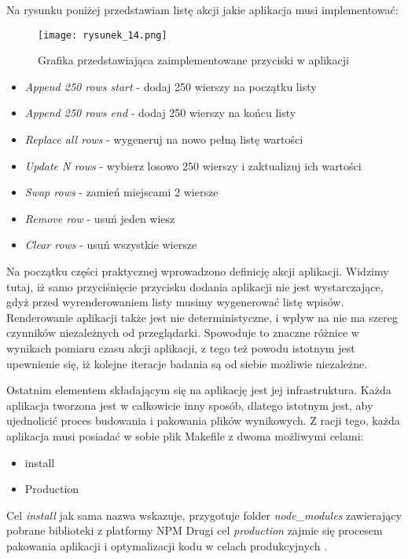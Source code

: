 Na rysunku poniżej przedstawiam listę akcji jakie aplikacja musi implementować:

\begin{figure}[htbp]
    \centering
    \texttt{[image: rysunek\_14.png]}
    \caption{Grafika przedstawiająca zaimplementowane przyciski w aplikacji}
    \label{fig:rysunek_14}
\end{figure}

\begin{itemize}
    \item \emph{Append 250 rows start} - dodaj 250 wierszy na początku listy
    \item \emph{Append 250 rows end} - dodaj 250 wierszy na końcu listy
    \item \emph{Replace all rows} - wygeneruj na nowo pełną listę wartości
    \item \emph{Update N rows} - wybierz losowo 250 wierszy i zaktualizuj ich wartości
    \item \emph{Swap rows} - zamień miejscami 2 wiersze
    \item \emph{Remove row} - usuń jeden wiesz
    \item \emph{Clear rows} - usuń wszystkie wiersze
\end{itemize}

Na początku części praktycznej wprowadzono definicję akcji aplikacji. Widzimy tutaj, iż samo przyciśnięcie przycisku dodania aplikacji nie jest wystarczające, gdyż przed wyrenderowaniem listy musimy wygenerować listę wpisów.
Renderowanie aplikacji także jest nie deterministyczne, i wpływ na nie ma szereg czynników niezależnych od przeglądarki.
Spowoduje to znaczne różnice w wynikach pomiaru czasu akcji aplikacji, z tego też powodu istotnym jest upewnienie się, iż kolejne iteracje badania są od siebie możliwie niezależne.

Ostatnim elementem składającym się na aplikację jest jej infrastruktura. Każda aplikacja tworzona jest w całkowicie inny sposób, dlatego istotnym jest, aby ujednolicić proces budowania i pakowania plików wynikowych.
Z racji tego, każda aplikacja musi posiadać w sobie plik Makefile \cite{gnu-makefile} z dwoma możliwymi celami:

\begin{itemize}
    \item install
    \item Production
\end{itemize}

Cel \emph{install} jak sama nazwa wskazuje, przygotuje folder \emph{node\_modules} zawierający pobrane biblioteki z platformy NPM \cite{npm}
Drugi cel \emph{production} zajmie się procesem pakowania aplikacji i optymalizacji kodu w celach produkcyjnych \cite{react-perf}.

